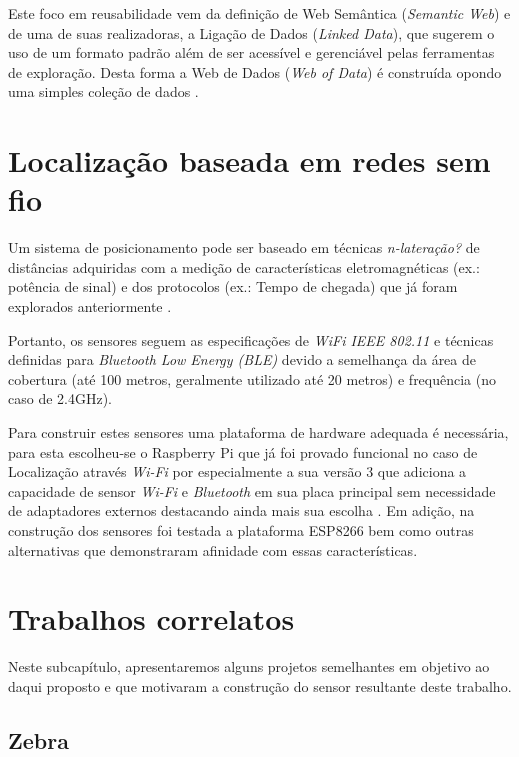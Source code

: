 Este foco em reusabilidade vem da definição de Web Semântica (\emph{Semantic
Web}) e de uma de suas realizadoras, a Ligação de Dados (\emph{Linked Data}),
que sugerem o uso de um formato padrão além de ser acessível e gerenciável pelas
ferramentas de exploração. Desta forma a Web de Dados (\emph{Web of Data}) é
construída opondo uma simples coleção de dados \cite{Bizer2009}.

\section{Localização baseada em redes sem fio}
\label{sec:Localização baseada em redes sem fio}

Um sistema de posicionamento pode ser baseado em técnicas
\emph{n-lateração?} de distâncias adquiridas com a medição de características
eletromagnéticas (ex.: potência de sinal) e dos protocolos (ex.: Tempo de
chegada) que já foram explorados anteriormente \cite{Abusubaih2007,
bahillo2009ieee, Feldmann2003}.

Portanto, os sensores seguem as especificações de \emph{WiFi IEEE 802.11}
\cite{Crow1997} e técnicas definidas para \emph{Bluetooth Low Energy (BLE)}
\cite{Hossain2007} devido a semelhança da área de cobertura (até 100 metros,
geralmente utilizado até 20 metros) e frequência (no caso de 2.4GHz).

Para construir estes sensores uma plataforma de hardware adequada é necessária,
para esta escolheu-se o Raspberry Pi \cite{Vujovic2014, Vujovic2015} que já
foi provado funcional no caso de Localização através \emph{Wi-Fi} por
 especialmente a sua versão 3 que adiciona a capacidade
de sensor \emph{Wi-Fi} e \emph{Bluetooth} em sua placa principal sem
necessidade de adaptadores externos destacando ainda mais sua escolha
\cite{RPI2016}. Em adição, na construção dos sensores foi testada a plataforma ESP8266 bem como
outras alternativas que demonstraram afinidade com essas características.


\section{Trabalhos correlatos}
\label{Trabalhos correlatos}
Neste subcapítulo, apresentaremos alguns projetos semelhantes em objetivo ao daqui
proposto e que motivaram a construção do sensor resultante deste trabalho.

\subsection{Zebra}
\label{subsec:Zebra}

